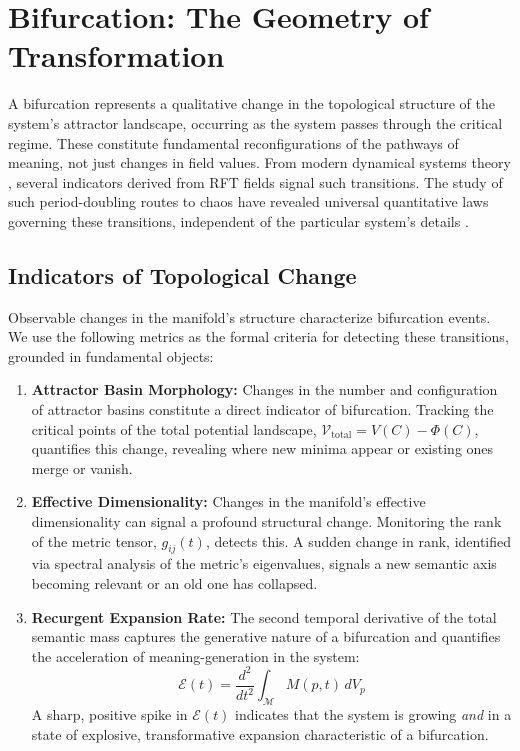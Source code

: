 \section{Bifurcation: The Geometry of Transformation}

A bifurcation represents a qualitative change in the topological structure of the system's attractor landscape, occurring as the system passes through the critical regime. These constitute fundamental reconfigurations of the pathways of meaning, not just changes in field values. From modern dynamical systems theory \autocite{Poincare1892, Lorenz1963, Smale1967, RuelleTakens1971, GuckenheimerHolmes1983, Kuznetsov2004, Strogatz2014}, several indicators derived from RFT fields signal such transitions. The study of such period-doubling routes to chaos have revealed universal quantitative laws governing these transitions, independent of the particular system's details \autocite{Feigenbaum1978}.

\subsection{Indicators of Topological Change}

Observable changes in the manifold's structure characterize bifurcation events. We use the following metrics as the formal criteria for detecting these transitions, grounded in fundamental objects:
\begin{enumerate}
    \item \textbf{Attractor Basin Morphology:} Changes in the number and configuration of attractor basins constitute a direct indicator of bifurcation. Tracking the critical points of the total potential landscape, \(\mathcal{V}_{\text{total}} = V(C) - \Phi(C)\), quantifies this change, revealing where new minima appear or existing ones merge or vanish.
    \item \textbf{Effective Dimensionality:} Changes in the manifold's effective dimensionality can signal a profound structural change. Monitoring the rank of the metric tensor, \(g_{ij}(t)\), detects this. A sudden change in rank, identified via spectral analysis of the metric's eigenvalues, signals a new semantic axis becoming relevant or an old one has collapsed.
    \item \textbf{Recurgent Expansion Rate:} The second temporal derivative of the total semantic mass captures the generative nature of a bifurcation and quantifies the acceleration of meaning-generation in the system:
    \begin{equation}
    \mathcal{E}(t) = \frac{d^2}{dt^2}\int_{\mathcal{M}} M(p,t) \, dV_p
    \end{equation}
    A sharp, positive spike in \(\mathcal{E}(t)\) indicates that the system is growing \textit{and} in a state of explosive, transformative expansion characteristic of a bifurcation.
\end{enumerate}

